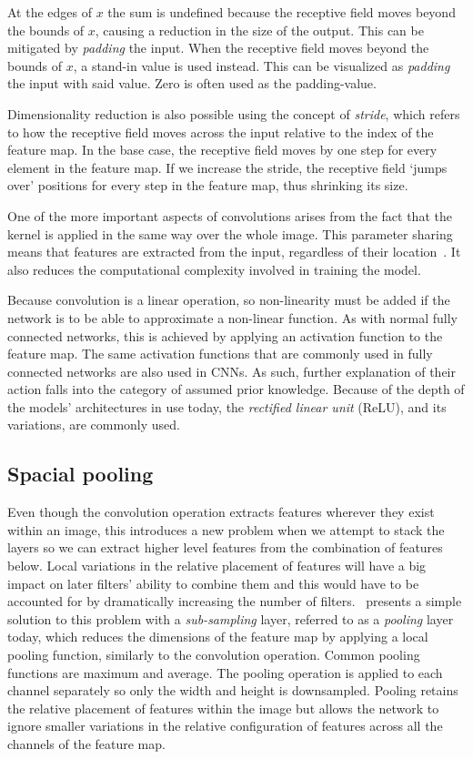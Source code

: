At the edges of \(x\) the sum is undefined because the receptive field moves beyond the bounds of \(x\), causing a reduction in the size of the output.
This can be mitigated by \textit{padding} the input.
When the receptive field moves beyond the bounds of \(x\), a stand-in value is used instead.
This can be visualized as \textit{padding} the input with said value.
Zero is often used as the padding-value.

Dimensionality reduction is also possible using the concept of \textit{stride}, which refers to how the receptive field moves across the input relative to the index of the feature map.
In the base case, the receptive field moves by one step for every element in the feature map.
If we increase the stride, the receptive field `jumps over' positions for every step in the feature map, thus shrinking its size. 

One of the more important aspects of convolutions arises from the fact that the kernel is applied in the same way over the whole image.
This parameter sharing means that features are extracted from the input, regardless of their location~\parencite{lecum1989}.
It also reduces the computational complexity involved in training the model.

Because convolution is a linear operation, so non-linearity must be added if the network is to be able to approximate a non-linear function.
As with normal fully connected networks, this is achieved by applying an activation function to the feature map.
The same activation functions that are commonly used in fully connected networks are also used in CNNs.
As such, further explanation of their action falls into the category of assumed prior knowledge.
Because of the depth of the models’ architectures in use today, the \textit{rectified linear unit} (ReLU), and its variations, are commonly used.

\subsection{Spacial pooling}
Even though the convolution operation extracts features wherever they exist within an image, this introduces a new problem when we attempt to stack the layers so we can extract higher level features from the combination of features below.
Local variations in the relative placement of features will have a big impact on later filters' ability to combine them and this would have to be accounted for by dramatically increasing the number of filters.~\cite{lecun1998gradient} presents a simple solution to this problem with a \textit{sub-sampling} layer, referred to as a \textit{pooling} layer today, which reduces the dimensions of the feature map by applying a local pooling function, similarly to the convolution operation.
Common pooling functions are maximum and average.
The pooling operation is applied to each channel separately so only the width and height is downsampled.
Pooling retains the relative placement of features within the image but allows the network to ignore smaller variations in the relative configuration of features across all the channels of the feature map.

